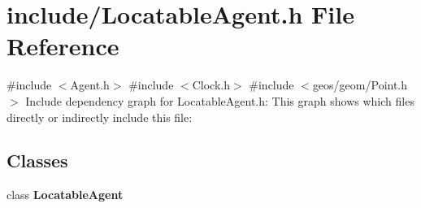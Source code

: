 \section{include/\+Locatable\+Agent.h File Reference}
\label{_locatable_agent_8h}
{\ttfamily \#include $<$Agent.\+h$>$}\newline
{\ttfamily \#include $<$Clock.\+h$>$}\newline
{\ttfamily \#include $<$geos/geom/\+Point.\+h$>$}\newline
Include dependency graph for Locatable\+Agent.\+h\+:
This graph shows which files directly or indirectly include this file\+:
\subsection*{Classes}
\begin{DoxyCompactItemize}
\item 
class \textbf{ Locatable\+Agent}
\end{DoxyCompactItemize}
